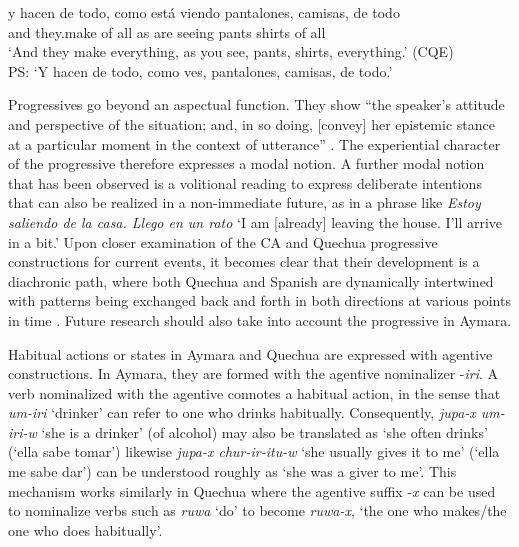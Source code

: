 \documentclass[output=paper,hidelinks]{langscibook}
\begin{document}
\ea \label{ex:todo}
\gll y hacen de todo, como está viendo pantalones, camisas, de todo \\
and they.make of all as are seeing pants shirts of all \\ \glt ‘And they make everything, as you see, pants, shirts, everything.’ (CQE)\\
PS: `Y hacen de todo, como ves, pantalones, camisas, de todo.'
\z

Progressives go beyond an aspectual function. They show ``the speaker's attitude and perspective of the situation; and, in so doing, [convey] her epistemic stance at a particular moment in the context of utterance'' \citep[157]{RN15}. The experiential character of the progressive therefore expresses a modal notion. A further modal notion that has been observed is a volitional reading to express deliberate intentions that can also be realized in a non-immediate future, as in a phrase like \textit{Estoy saliendo de la casa. Llego en un rato} `I am [already] leaving the house. I’ll arrive in a bit.' Upon closer examination of the CA and Quechua progressive constructions for current events, it becomes clear that their development is a diachronic path, where both Quechua and Spanish are dynamically intertwined with patterns being exchanged back and forth in both directions at various points in time \citep{Soto2016}. Future research should also take into account the progressive in Aymara.

Habitual actions or states in Aymara and Quechua are expressed with agentive constructions. In Aymara, they are formed with the agentive nominalizer -\textit{iri}. A verb nominalized with the agentive connotes a habitual action, in the sense that \textit{um-iri} ‘drinker’ can refer to one who drinks habitually. Consequently, \textit{jupa-x um-iri-w} ‘she is a drinker’ (of alcohol) may also be translated as ‘she often drinks’ (‘ella sabe tomar’) likewise \textit{jupa-x chur-ir-itu-w} ‘she usually gives it to me’ (‘ella me sabe dar’) can be understood roughly as ‘she was a giver to me’. This mechanism works similarly in Quechua where the agentive suffix -\textit{x} can be used to nominalize verbs such as \textit{ruwa} `do' to become \textit{ruwa-x}, `the one who makes/the one who does habitually'. %
\end{document}

